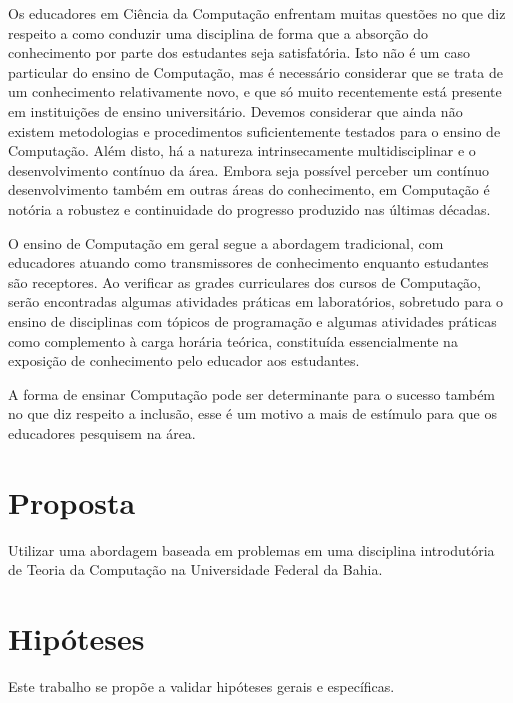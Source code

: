 \newcommand{\publicacaoTemplate}[2]{%
\textbf{#1} : #2}


\acresetall
\label{cap-introducao}
Os educadores em Ciência da Computação enfrentam muitas questões no que diz
respeito a como conduzir uma disciplina de forma que a absorção do conhecimento
por parte dos estudantes seja satisfatória.
Isto não é um caso particular do ensino de Computação,
mas é necessário considerar que se trata de
um conhecimento relativamente novo, e que só muito
recentemente está presente em instituições de ensino universitário.
Devemos considerar que ainda não existem metodologias e procedimentos
suficientemente testados para o ensino de Computação.
Além disto, há a natureza intrinsecamente multidisciplinar e
o desenvolvimento contínuo da área.
Embora seja possível perceber um contínuo desenvolvimento também em
outras áreas do conhecimento, em Computação é notória a robustez e
continuidade do progresso produzido nas últimas décadas.

O ensino de Computação em geral segue a abordagem tradicional,
com educadores atuando como transmissores de conhecimento
enquanto estudantes são receptores.
Ao verificar as grades curriculares dos cursos de Computação,
serão encontradas algumas atividades práticas em laboratórios,
sobretudo para o ensino de disciplinas com tópicos de programação e
algumas atividades práticas como complemento à carga horária teórica,
constituída essencialmente na exposição de conhecimento pelo educador
aos estudantes.

A forma de ensinar Computação pode ser determinante
para o sucesso também no que diz respeito a
inclusão, esse é um motivo a mais de estímulo para
que os educadores pesquisem na área.

\section{Proposta}
\label{sec-proposta}
Utilizar uma abordagem baseada em problemas em uma disciplina
introdutória de Teoria da Computação na Universidade Federal da Bahia.

\section{Hipóteses}
\label{sec-hipoteses}
Este trabalho se propõe a validar hipóteses gerais e específicas.


